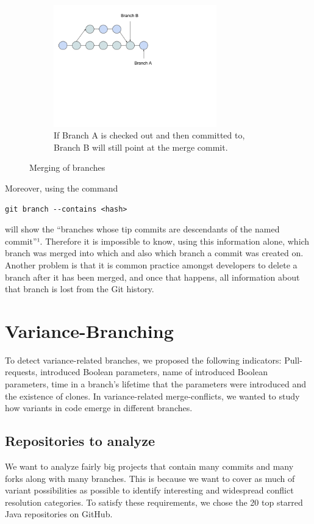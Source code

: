 \begin{figure}
 ~ %
 \begin{subfigure}[b]{0.3\textwidth}
     \includegraphics[width=200pt]{figure/branch3.png}
     \caption{If Branch A is checked out and then committed to, Branch B will still point at the merge commit.}
     \label{fig:mbranch3}
 \end{subfigure}
 \caption{Merging of branches}\label{fig:branches}
\end{figure}

Moreover, using the command
\lstset{language=Bash,numbers=left,xleftmargin=2em,frame=single,framexleftmargin=1.5em}
\begin{lstlisting}[frame=single,breaklines=true,tabsize=2]
git branch --contains <hash>
\end{lstlisting}
will show the “branches whose tip commits are descendants of the named commit”¹. Therefore it is impossible to know, using this information alone, which branch was merged into which and also which branch a commit was created on. Another problem is that it is common practice amongst developers to delete a branch after it has been merged, and once that happens, all information about that branch is lost from the Git history.
\section{Variance-Branching}
To detect variance-related branches, we proposed the following indicators: Pull-requests, introduced Boolean parameters, name of introduced Boolean parameters, time in a branch’s lifetime that the parameters were introduced and the existence of clones. In variance-related merge-conflicts, we wanted to study how variants in code emerge in different branches.
\subsection{Repositories to analyze}
We want to analyze fairly big projects that contain many commits and many forks along with many branches. This is because we want to cover as much of variant possibilities as possible to identify interesting and widespread conflict resolution categories. To satisfy these requirements, we chose the 20 top starred Java repositories on GitHub.


